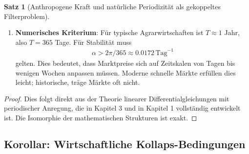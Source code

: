 \documentclass[a4paper,12pt,twoside]{report}
\theoremstyle{definition}
\newtheorem{satz}{Satz}
\begin{document}
\begin{satz}[Anthropogene Kraft und natürliche Periodizität als gekoppeltes Filterproblem]
\begin{enumerate}
\item \textbf{Numerisches Kriterium}: Für typische Agrarwirtschaften ist $T \approx 1$ Jahr, also $T = 365$ Tage. Für Stabilität muss
\begin{align}
\alpha > 2\pi / 365 \approx 0.0172 \, \text{Tag}^{-1}
\end{align}
gelten. Dies bedeutet, dass Marktpreise sich auf Zeitskalen von Tagen bis wenigen Wochen anpassen müssen. Moderne schnelle Märkte erfüllen dies leicht; historische, träge Märkte oft nicht.

\end{enumerate}

\end{satz}

\begin{proof}

Dies folgt direkt aus der Theorie linearer Differentialgleichungen mit periodischer Anregung, die in Kapitel 3 und in \cite{epp_signal} Kapitel 1 vollständig entwickelt ist. Die Isomorphie der mathematischen Strukturen ist exakt.

\end{proof}

\subsection{Korollar: Wirtschaftliche Kollaps-Bedingungen}
\end{document}
